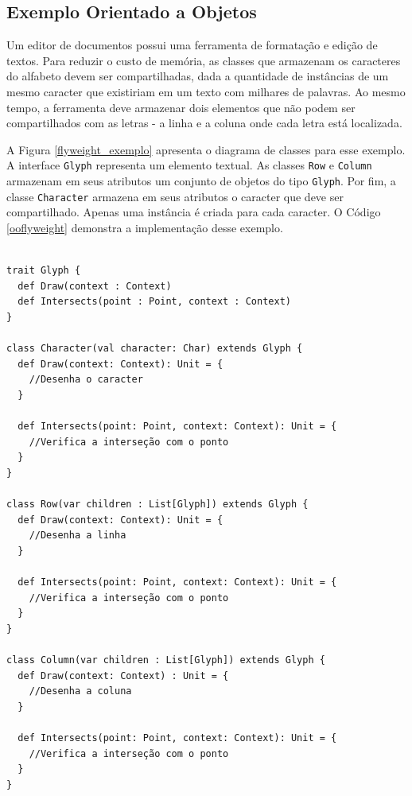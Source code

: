 \subsection*{Exemplo Orientado a Objetos}

Um editor de documentos possui uma ferramenta 
de formatação e edição de textos. Para reduzir o 
custo de memória, as classes que armazenam os 
caracteres do alfabeto devem ser compartilhadas, 
dada a quantidade de instâncias de um mesmo caracter 
que existiriam em um texto com milhares de palavras. 
Ao mesmo tempo, a ferramenta deve armazenar dois 
elementos que não podem ser compartilhados com as 
letras - a linha e a coluna onde cada letra está 
localizada. 

A Figura \ref{flyweight_exemplo} apresenta o diagrama 
de classes para esse exemplo. A interface \texttt{Glyph} 
representa um elemento textual. As classes \texttt{Row} e 
\texttt{Column} armazenam em seus atributos um conjunto de objetos 
do tipo \texttt{Glyph}. 
Por fim, a classe \texttt{Character} armazena em seus atributos 
o caracter que deve ser compartilhado. Apenas uma 
instância é criada para cada caracter. O 
Código \ref{ooflyweight} demonstra a implementação 
desse exemplo.

\begin{lstlisting}[caption={\textit{Flyweight} Orientado a Objetos.},label=ooflyweight]

trait Glyph {
  def Draw(context : Context)
  def Intersects(point : Point, context : Context)
}

class Character(val character: Char) extends Glyph {
  def Draw(context: Context): Unit = {
    //Desenha o caracter
  }

  def Intersects(point: Point, context: Context): Unit = {
    //Verifica a interseção com o ponto
  }
}

class Row(var children : List[Glyph]) extends Glyph {
  def Draw(context: Context): Unit = {
    //Desenha a linha
  }

  def Intersects(point: Point, context: Context): Unit = {
    //Verifica a interseção com o ponto
  }
}

class Column(var children : List[Glyph]) extends Glyph {
  def Draw(context: Context) : Unit = {
    //Desenha a coluna
  }

  def Intersects(point: Point, context: Context): Unit = {
    //Verifica a interseção com o ponto
  }
}

\end{lstlisting}

